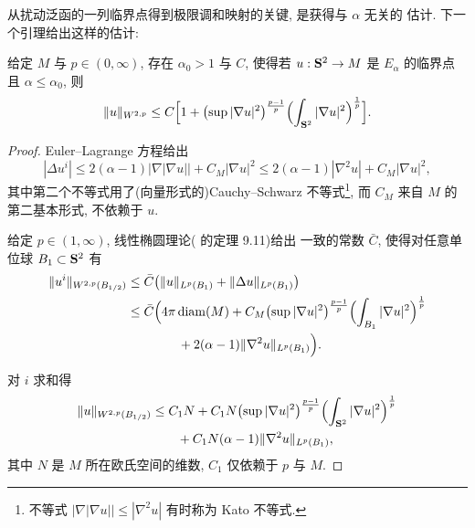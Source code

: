 从扰动泛函的一列临界点得到极限调和映射的关键, 是获得与 $\alpha$ 无关的
估计. 下一个引理给出这样的估计:

\begin{lemma}
\label{lem:4.29}
给定 $M$ 与 $p\in(0,\infty)$, 存在 $\alpha_0>1$ 与 $C$, 使得若
$u:\mathbf{S}^2\to M$ 是 $E_\alpha$ 的临界点且 $\alpha\leq\alpha_0$, 则
\begin{equation}
\|u\|_{W^{2,p}}\leq C\Bigl[1+\bigl(\sup|\nabla u|^2\bigr)
 ^{\frac{p-1}{p}}\Bigl(\int_{\mathbf{S}^2}|\nabla u|^2\Bigr)^{\frac1p}\Bigr].
\label{eq:4.69}
\end{equation}
\end{lemma}

\begin{proof}
Euler--Lagrange 方程给出
\begin{equation*}
|\Delta u^i|\leq2(\alpha-1)|\nabla|\nabla u||+C_M|\nabla u|^2
 \leq2(\alpha-1)|\nabla^2u|+C_M|\nabla u|^2,
\end{equation*}
其中第二个不等式用了(向量形式的)Cauchy--Schwarz 不等式\footnote{不等式
$|\nabla|\nabla u||\leq|\nabla^2u|$ 有时称为 Kato 不等式.}, 而 $C_M$
来自 $M$ 的第二基本形式, 不依赖于 $u$.

给定 $p\in(1,\infty)$, 线性椭圆理论(\cite{GiTr} 的定理 9.11)给出
一致的常数 $\bar{C}$, 使得对任意单位球 $B_1\subset\mathbf{S}^2$ 有
\begin{equation}
\begin{aligned}
\|u^i\|_{W^{2,p}(B_{1/2})}
&\leq\bar{C}\bigl(\|u\|_{L^p(B_1)}+\|\Delta u\|_{L^p(B_1)}\bigr)\\
&\leq\bar{C}\Bigl(4\pi\operatorname{diam}(M)+C_M\bigl(\sup|\nabla u|^2\bigr)
 ^{\frac{p-1}{p}}\Bigl(\int_{B_1}|\nabla u|^2\Bigr)^{\frac1p}\\
&\qquad\qquad+2(\alpha-1)\|\nabla^2u\|_{L^p(B_1)}\Bigr).
\end{aligned}
\label{eq:4.70}
\end{equation}

对 $i$ 求和得
\begin{equation}
\begin{aligned}
\|u\|_{W^{2,p}(B_{1/2})}
&\leq C_1N+C_1N\bigl(\sup|\nabla u|^2\bigr)^{\frac{p-1}{p}}
 \Bigl(\int_{\mathbf{S}^2}|\nabla u|^2\Bigr)^{\frac1p}\\
&\qquad+C_1N(\alpha-1)\|\nabla^2u\|_{L^p(B_1)},
\end{aligned}
\label{eq:4.71}
\end{equation}
其中 $N$ 是 $M$ 所在欧氏空间的维数, $C_1$ 仅依赖于 $p$ 与 $M$.


\end{proof}
